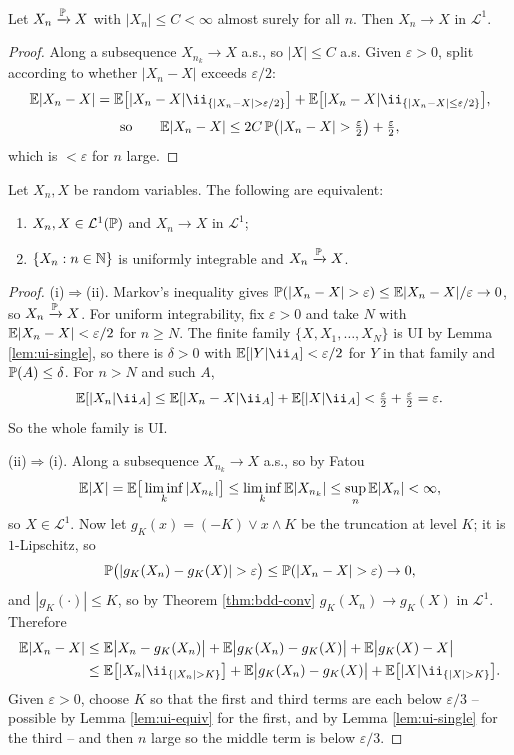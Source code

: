 \documentclass[a4paper]{scrartcl}
\newcommand{\cL}{\mathcal{L}}
\newcommand{\ind}{\ii}
\begin{document}
\begin{theorem}\label{thm:bdd-conv}
	Let $X_n\xrightarrow{\mathbb{P}}X$ with $|X_n| \leq C < \infty$ almost surely for all $n$. Then $X_n \to X$ in $\cL^1$.
\end{theorem}
\begin{proof}
	Along a subsequence $X_{n_k}\to X$ a.s., so $|X|\leq C$ a.s. Given $\varepsilon>0$, split according to whether $|X_n - X|$ exceeds $\varepsilon/2$:
	$$
	\EE|X_n - X| = \EE\big[|X_n-X|\ind_{\{|X_n-X|>\varepsilon/2\}}\big]+\EE\big[|X_n-X|\ind_{\{|X_n-X|\leq\varepsilon/2\}}\big],
	$$
	$$
	\text{so} \qquad \EE|X_n-X| \leq 2C\,\PP\big(|X_n-X|>\tfrac\varepsilon2\big)+\tfrac\varepsilon2,
	$$
	which is $<\varepsilon$ for $n$ large.
\end{proof}

\begin{theorem}\label{thm:vitali}
	Let $X_n, X$ be random variables. The following are equivalent:
	\begin{enumerate}[label=(\roman*)]
		\item $X_n, X \in \cL^1(\PP)$ and $X_n \to X$ in $\cL^1$;
		\item $\{X_n : n \in\mathbb{N}\}$ is uniformly integrable and $X_n \xrightarrow{\mathbb{P}} X$.
	\end{enumerate}
\end{theorem}
\begin{proof}
	(i)$\Rightarrow$(ii). Markov's inequality gives $\PP(|X_n-X|>\varepsilon)\leq \EE|X_n-X|/\varepsilon\to0$, so $X_n\xrightarrow{\mathbb{P}}X$. For uniform integrability, fix $\varepsilon>0$ and take $N$ with $\mathbb{E}|X_n - X|<\varepsilon/2$ for $n \geq N$. The finite family $\{X, X_1,\dots,X_N\}$ is UI by Lemma \ref{lem:ui-single}, so there is $\delta>0$ with $\EE[|Y|\ind_A]<\varepsilon/2$ for $Y$ in that family and $\mathbb{P}(A)\leq\delta$. For $n>N$ and such $A$,
	$$
	\EE[|X_n|\ind_A] \leq \EE[|X_n - X|\ind_A]+\EE[|X|\ind_A] < \tfrac\varepsilon2+\tfrac\varepsilon2 = \varepsilon.
	$$
	So the whole family is UI.

	(ii)$\Rightarrow$(i). Along a subsequence $X_{n_k}\to X$ a.s., so by Fatou
	$$
	\mathbb{E}|X| = \mathbb{E}\big[\liminf_k |X_{n_k}|\big]\leq\liminf_k \mathbb{E}|X_{n_k}|\leq \sup_n \mathbb{E}|X_n|<\infty,
	$$
	so $X \in \cL^1$. Now let $g_K(x) = (-K)\vee x \wedge K$ be the truncation at level $K$; it is $1$-Lipschitz, so
	$$
	\PP\big(|g_K(X_n)-g_K(X)|>\varepsilon\big)\leq \PP(|X_n - X|>\varepsilon)\to0,
	$$
	and $|g_K(\cdot)|\leq K$, so by Theorem \ref{thm:bdd-conv} $g_K(X_n)\to g_K(X)$ in $\cL^1$. Therefore
	\begin{align*}
		\EE|X_n - X| &\leq \EE\big|X_n - g_K(X_n)\big| + \EE\big|g_K(X_n)-g_K(X)\big|+\EE\big|g_K(X)-X\big|\\
		&\leq \EE\big[|X_n|\ind_{\{|X_n|>K\}}\big]+\EE\big|g_K(X_n)-g_K(X)\big|+\EE\big[|X|\ind_{\{|X|>K\}}\big].
	\end{align*}
	Given $\varepsilon>0$, choose $K$ so that the first and third terms are each below $\varepsilon/3$ -- possible by Lemma \ref{lem:ui-equiv} for the first, and by Lemma \ref{lem:ui-single} for the third -- and then $n$ large so the middle term is below $\varepsilon/3$.
\end{proof}
\end{document}
